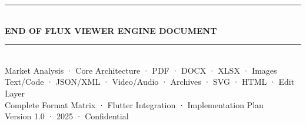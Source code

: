 \documentclass[12pt,a4paper]{report}
\begin{document}
\vspace{24pt}
\begin{center}
  \color{P1}\rule{0.5\linewidth}{1pt}\\[8pt]
  {\sffamily\bfseries\Large END OF FLUX VIEWER ENGINE DOCUMENT}\\[6pt]
  \rule{0.5\linewidth}{1pt}\\[8pt]
  {\sffamily\small\color{GY}
    Market Analysis · Core Architecture · PDF · DOCX · XLSX · Images\\[3pt]
    Text/Code · JSON/XML · Video/Audio · Archives · SVG · HTML · Edit Layer\\[3pt]
    Complete Format Matrix · Flutter Integration · Implementation Plan\\[4pt]
    Version 1.0 · 2025 · Confidential
  }
\end{center}
\end{document}
